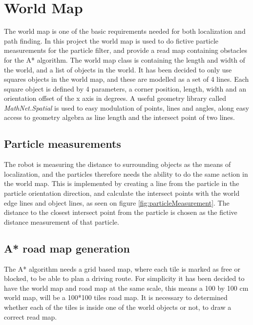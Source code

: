 
\section{World Map}
\label{sec:worldMap}

The world map is one of the basic requirements needed for both localization and path finding.
In this project the world map is used to do fictive particle measurements for the particle filter, and provide a read map containing obstacles for the A* algorithm.
The world map class is containing the length and width of the world, and a list of objects in the world.
It has been decided to only use squares objects in the world map, and these are modelled as a set of 4 lines.
Each square object is defined by 4 parameters, a corner position, length, width and an orientation offset of the x axis in degrees.
A useful geometry library called \emph{MathNet.Spatial} is used to easy modulation of points, lines and angles, along easy access to geometry algebra as line length and the intersect point of two lines.

\subsection{Particle measurements}

The robot is measuring the distance to surrounding objects as the means of localization, and the particles therefore needs the ability to do the same action in the world map.
This is implemented by creating a line from the particle in the particle orientation direction, and calculate the intersect points with the world edge lines and object lines, as seen on figure \ref{fig:particleMeasurement}.
The distance to the closest intersect point from the particle is chosen as the fictive distance measurement of that particle.


\subsection{A* road map generation}

The A* algorithm needs a grid based map, where each tile is marked as free or blocked, to be able to plan a driving route.
For simplicity it has been decided to have the world map and road map at the same scale, this means a 100 by 100 cm world map, will be a 100*100 tiles road map.
It is necessary to determined whether each of the tiles is inside one of the world objects or not, to draw a correct read map.

